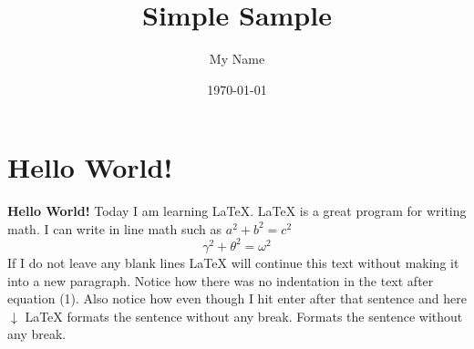 \documentclass{article}
\title{Simple Sample}
\author{My Name}
\date{\today}
\begin{document}
    \maketitle

    \section{Hello World!}

    \textbf{Hello World!} Today I am learning \LaTeX.
    \LaTeX{} is a great program for writing math. I can write in line math such as $a^2+b^2=c^2$
    \begin{equation}
    \gamma^2+\theta^2=\omega^2
    \end{equation}
    If I do not leave any blank lines \LaTeX{} will continue  this text without making it into a new paragraph.  Notice how there was no indentation in the text after equation (1).
    Also notice how even though I hit enter after that sentence and here $\downarrow$
    \LaTeX{} formats the sentence without any break. Formats the sentence without any break.
\end{document}
